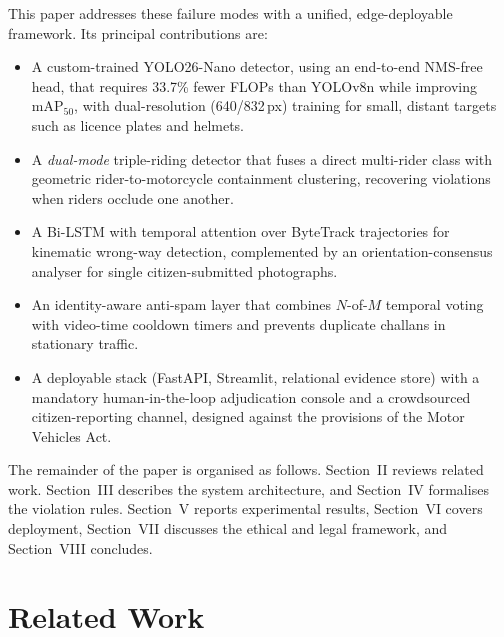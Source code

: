 \documentclass[conference]{IEEEtran}
\begin{document}
This paper addresses these failure modes with a unified, edge-deployable framework. Its principal contributions are:

\begin{itemize}
\item A custom-trained YOLO26-Nano detector, using an end-to-end NMS-free head, that requires 33.7\% fewer FLOPs than YOLOv8n while improving mAP$_{50}$, with dual-resolution (640/832\,px) training for small, distant targets such as licence plates and helmets.
\item A \emph{dual-mode} triple-riding detector that fuses a direct multi-rider class with geometric rider-to-motorcycle containment clustering, recovering violations when riders occlude one another.
\item A Bi-LSTM with temporal attention over ByteTrack trajectories for kinematic wrong-way detection, complemented by an orientation-consensus analyser for single citizen-submitted photographs.
\item An identity-aware anti-spam layer that combines $N$-of-$M$ temporal voting with video-time cooldown timers and prevents duplicate challans in stationary traffic.
\item A deployable stack (FastAPI, Streamlit, relational evidence store) with a mandatory human-in-the-loop adjudication console and a crowdsourced citizen-reporting channel, designed against the provisions of the Motor Vehicles Act.
\end{itemize}

The remainder of the paper is organised as follows. Section~II reviews related work. Section~III describes the system architecture, and Section~IV formalises the violation rules. Section~V reports experimental results, Section~VI covers deployment, Section~VII discusses the ethical and legal framework, and Section~VIII concludes.

\section{Related Work}
\end{document}
